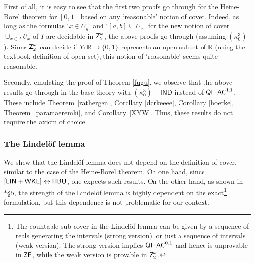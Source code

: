 \documentclass[reqno]{amsart}
\def\Z{\textup{\textsf{Z}}}
\def\ZF{\textup{\textsf{ZF}}}
\def\WKL{\textup{\textsf{WKL}}}
\def\R{{\mathbb  R}}
\def\di{\rightarrow}
\def\asa{\leftrightarrow}
\def\QFAC{\textup{\textsf{QF-AC}}}
\def\HBU{\textup{\textsf{HBU}}}
\def\LIN{\textup{\textsf{LIN}}}
\numberwithin{equation}{section}
\numberwithin{thm}{section}
\begin{document}
\smallskip

First of all, it is easy to see that the first two proofs go through for the Heine-Borel theorem for $[0,1]$ based on {any `reasonable' notion} of cover.
Indeed, as long as the formulas `$x\in U_{y}$' and `$[a,b]\subseteq U_{x}$' for the new notion of cover $\cup_{x\in I}U_{x}$ of $I$ are decidable in $\Z_{2}^{\omega}$, the above proofs go through (assuming $(\kappa_{0}^{3})$).  
Since $\Z_{2}^{\omega}$ can decide if $Y:\R\di \{0,1\}$ represents an open subset of $\R$ (using the textbook definition of open set), this notion of `reasonable' seems quite reasonable. 

\smallskip

Secondly, emulating the proof of Theorem \ref{fugu}, we observe that the above results go through in the base theory with $(\kappa_{0}^{3})+\textsf{IND}$ instead of $\QFAC^{1,1}$.  
These include Theorem~\ref{rathergen}, Corollary \ref{dorkeeee}, Corollary \ref{hoerke}, Theorem~\ref{paramaeremki}, and Corollary~\ref{XYW}. 
Thus, these results do not require the axiom of choice.  


\subsubsection{The Lindel\"of lemma}
We show that the Lindel\"of lemma does not depend on the definition of cover, similar to the case of the Heine-Borel theorem.  
On one hand, since $[\LIN+\WKL]\asa \HBU$, one expects such results.  
On the other hand, as shown in \cite{dagsamV}*{\S5}, the strength of the Lindel\"of lemma is highly dependent on the exact\footnote{The countable sub-cover in the Lindel\"of lemma can be given by a sequence of reals generating the intervals (strong version), or just a sequence of intervals (weak version). 
The strong version implies $\QFAC^{0,1}$ and hence is unprovable in $\ZF$, while the weak version is provable in $\Z_{2}^{\omega}$.  
} formulation, but this dependence is not problematic for our context.  
  
\smallskip  
  
\end{document}
